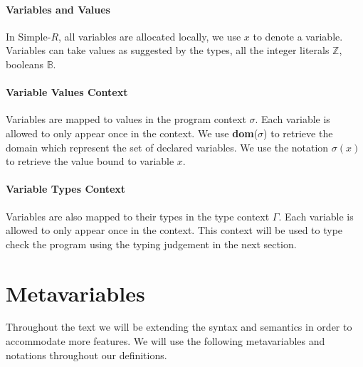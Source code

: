 \documentclass[a4paper,12pt]{report}
\begin{document}
\paragraph{Variables and Values} In Simple-$R$, all variables are allocated 
locally, we use $x$ to denote a variable. Variables can take values as suggested by the types, all the integer 
literals $\mathbb{Z}$, booleans $\mathbb{B}$.

\paragraph{Variable Values Context} Variables are mapped to values in the program 
context $\sigma$. Each variable is allowed to only appear once in 
the context. We use \textbf{dom}($\sigma$) to retrieve the domain which represent 
the set of declared variables. We use the notation $\sigma(x)$ 
to retrieve the value bound to variable $x$.

\paragraph{Variable Types Context} Variables are also mapped to their types 
in the type context $\Gamma$. Each variable is allowed to only appear once in 
the context. This context will be used to type check the program using the 
typing judgement in the next section.

\section{Metavariables}
Throughout the text we will be extending the syntax and semantics 
in order to accommodate more features. 
We will use the following metavariables and notations throughout our 
definitions.
\end{document}
